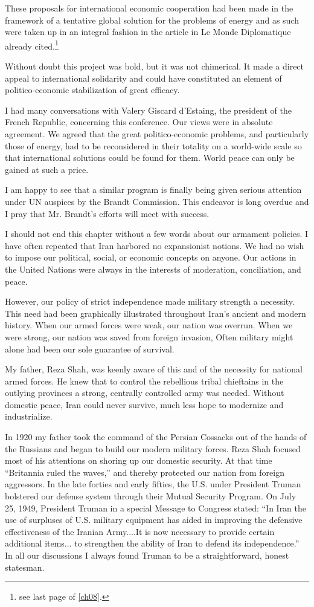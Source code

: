 These proposals for international economic cooperation had been made in the framework of a tentative global solution for the problems of energy and as such were taken up in an integral fashion in the article in Le Monde Diplomatique already cited.\footnote{see last page of \cref{ch08}.} 

Without doubt this project was bold, but it was not chimerical. It made a direct appeal to international solidarity and could have constituted an element of politico-economic stabilization of great efficacy. 

I had many conversations with Valery Giscard d'Estaing, the president of the French Republic, concerning this conference. Our views were in absolute agreement. We agreed that the great politico-economic problems, and particularly those of energy, had to be reconsidered in their totality on a world-wide scale so that international solutions could be found for them. World peace can only be gained at such a price. 

I am happy to see that a similar program is finally being given serious attention under UN auspices by the Brandt Commission. This endeavor is long overdue and I pray that Mr. Brandt's efforts will meet with success. 


I should not end this chapter without a few words about our armament policies. I have often repeated that Iran harbored no expansionist notions. We had no wish to impose our political, social, or economic concepts on anyone. Our actions in the United Nations were always in the interests of moderation, conciliation, and peace. 

However, our policy of strict independence made military strength a necessity. This need had been graphically illustrated throughout Iran's ancient and modern history. When our armed forces were weak, our nation was overrun. When we were strong, our nation was saved from foreign invasion, Often military might alone had been our sole guarantee of survival. 

My father, Reza Shah, was keenly aware of this and of the necessity for national armed forces. He knew that to control the rebellious tribal chieftains in the outlying provinces a strong, centrally controlled army was needed. Without domestic peace, Iran could never survive, much less hope to modernize and industrialize. 

In 1920 my father took the command of the Persian Cossacks out of the hands of the Russians and began to build our modern military forces. Reza Shah focused most of his attentions on shoring up our domestic security. At that time “Britannia ruled the waves,” and thereby protected our nation from foreign aggressors. In the late forties and early fifties, the U.S. under President Truman bolstered our defense system through their Mutual Security Program. On July 25, 1949, President Truman in a special Message to Congress stated: “In Iran the use of surpluses of U.S. military equipment has aided in improving the defensive effectiveness of the Iranian Army....It is now necessary to provide certain additional items... to strengthen the ability of Iran to defend its independence.” In all our discussions I always found Truman to be a straightforward, honest statesman. 

